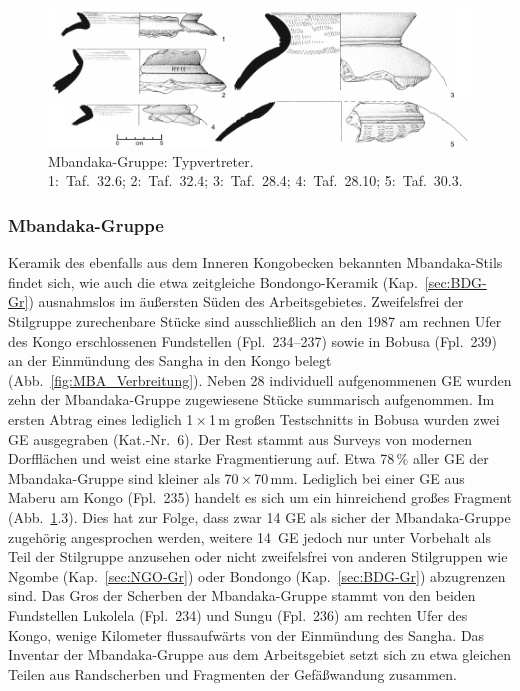 \begin{figure}[tb]
	\begin{minipage}[b]{.2\textwidth}
		\caption{Mbandaka-Gruppe: Typvertreter.\\1:~Taf.~32.6; 2:~Taf.~32.4; 3:~Taf.~28.4; 4:~Taf.~28.10; 5:~Taf.~30.3.}
		\label{fig:MBA_Typentafel}
	\end{minipage}\hfill
	\begin{minipage}[b]{.8\textwidth}
		\includegraphics[width=\textwidth]{fig/MBA-Typen.pdf}
	\end{minipage}
\end{figure}


\subsubsection{Mbandaka-Gruppe}\label{sec:MBA-Gr}

Keramik des ebenfalls aus dem Inneren Kongobecken bekannten Mbandaka-Stils findet sich, wie auch die etwa zeitgleiche Bondongo-Keramik (Kap.~\ref{sec:BDG-Gr}) ausnahmslos im äußersten Süden des Arbeitsgebietes. Zweifelsfrei der Stilgruppe zurechenbare Stücke sind ausschließlich an den 1987 am rechnen Ufer des Kongo erschlossenen Fundstellen (Fpl.~234--237) sowie in Bobusa (Fpl.~239) an der Einmündung des \mbox{Sangha} in den Kongo belegt (Abb.~\ref{fig:MBA_Verbreitung}). Neben 28 individuell aufgenommenen GE wurden zehn der Mbandaka-Gruppe zugewiesene Stücke summarisch aufgenommen. Im ersten Abtrag eines lediglich 1\,$\times$\,1\,m großen Testschnitts in Bobusa wurden zwei GE ausgegraben (Kat.-Nr.~6). Der Rest stammt aus Surveys von modernen Dorfflächen und weist eine starke Fragmentierung auf. Etwa 78\,\% aller GE der Mbandaka-Gruppe sind kleiner als 70\,$\times$\,70\,mm. Lediglich bei einer GE aus Maberu am Kongo (Fpl.~235) handelt es sich um ein hinreichend großes Fragment (Abb.~\ref{fig:MBA_Typentafel}.3). Dies hat zur Folge, dass zwar 14 GE als sicher der Mbandaka-Gruppe zugehörig angesprochen werden, weitere 14~GE jedoch nur unter Vorbehalt als Teil der Stilgruppe anzusehen oder nicht zweifelsfrei von anderen Stilgruppen wie Ngombe (Kap.~\ref{sec:NGO-Gr}) oder Bondongo (Kap.~\ref{sec:BDG-Gr}) abzugrenzen sind. Das Gros der Scherben der Mbandaka-Gruppe stammt von den beiden Fundstellen Lukolela (Fpl.~234) und Sungu (Fpl.~236) am rechten Ufer des Kongo, wenige Kilometer flussaufwärts von der Einmündung des \mbox{Sangha}. Das Inventar der Mbandaka-Gruppe aus dem Arbeitsgebiet setzt sich zu etwa gleichen Teilen aus Randscherben und Fragmenten der Gefäßwandung zusammen.


